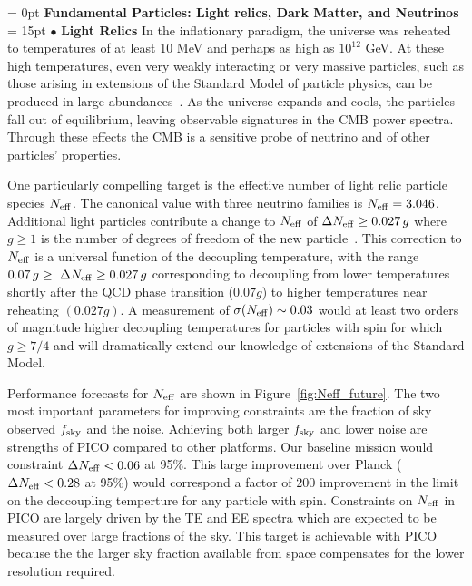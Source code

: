 \documentclass[PICOReport.tex]{subfiles}
\begin{document}
\vspace{0.1in}
\parindent = 0pt
{\bf Fundamental Particles: Light relics, Dark Matter, and Neutrinos} \\ %
\parindent = 15pt
$\bullet$ {\bf Light Relics} \hspace{0.1in} In the inflationary paradigm, the universe was reheated to temperatures of 
at least 10 MeV and perhaps as 
high as $10^{12}$ GeV.  At these high temperatures, even very weakly interacting or very massive particles, 
such as those arising in extensions of the Standard Model of particle physics, can be produced in large 
abundances~\cite{1979ARNPS..29..313S,Bolz:2000fu}.  As the universe expands and cools, 
the particles fall out of equilibrium, leaving observable signatures in the CMB power spectra. 
Through these effects the CMB is a sensitive probe of neutrino and of other particles' properties.  


One particularly compelling target is the effective number of light relic particle species ${N_{\rm eff}}$.
The canonical value with three neutrino families is ${N_{\rm eff}} = 3.046$. Additional light particles 
contribute a change to ${N_{\rm eff}}$ of $\Delta {N_{\rm eff}} \geq 0.027\,g$ where $g \geq 1$ is the number of 
degrees of freedom of the new particle~\cite{Brust:2013xpv,Baumann:2016wac}.  
This correction to ${N_{\rm eff}}$ is a universal function of the decoupling temperature, with the range 
$ 0.07\,g \geq \ \Delta {N_{\rm eff}} \geq 0.027\,g$ corresponding to decoupling from lower temperatures shortly after the QCD phase 
transition ($0.07g$) to higher temperatures near reheating $(0.027g)$.  A measurement of $\sigma({N_{\rm eff}}) \sim 0.03$ would 
at least two orders of magnitude higher decoupling temperatures for particles with spin for which $g \geq 7/4$ and will dramatically extend our knowledge of extensions of the Standard Model.

Performance forecasts for ${N_{\rm eff}}$ are shown in Figure~\ref{fig:Neff_future}.  The two most important parameters 
for improving constraints are the fraction of sky observed $f_{\rm sky}$ and the noise. Achieving both larger $f_{\rm sky}$ 
and lower noise are strengths of PICO compared to other platforms. 
Our baseline mission would constraint $\Delta {N_{\rm eff}} < 0.06$ at 95\%.  This large improvement over Planck ($\Delta {N_{\rm eff}} < 0.28$ at 95\%) would correspond a factor of 200 improvement in the limit on the deccoupling temperture for any particle with spin.  Constraints on ${N_{\rm eff}}$ in PICO are largely driven by the TE and EE spectra which are expected to be measured over large fractions of the sky.  This target is achievable with PICO because the the larger sky fraction available from space compensates for the lower resolution required.
\end{document}
